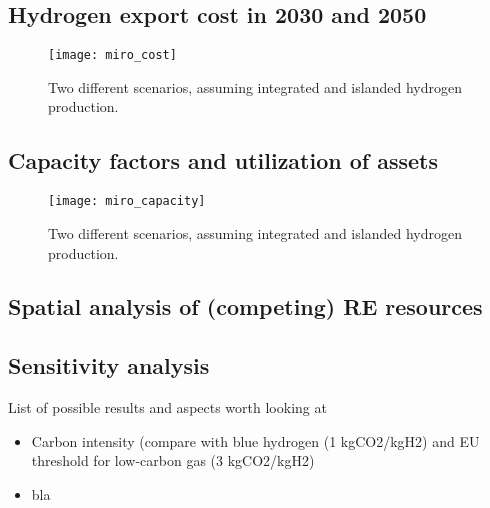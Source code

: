 \subsection{Hydrogen export cost in 2030 and 2050}

\begin{figure}[h!]
    \centering
    \texttt{[image: miro\_cost]}
    \caption{Two different scenarios, assuming integrated and islanded hydrogen production.}
    \label{fig:results_costs}
\end{figure}


\subsection{Capacity factors and utilization of assets}

\begin{figure}[h!]
    \centering
    \texttt{[image: miro\_capacity]}
    \caption{Two different scenarios, assuming integrated and islanded hydrogen production.}
    \label{fig:results_capacity}
\end{figure}

\subsection{Spatial analysis of (competing) RE resources}
\subsection{Sensitivity analysis}

List of possible results and aspects worth looking at
\begin{itemize}
    \item Carbon intensity (compare with blue hydrogen (1 kgCO2/kgH2) and EU threshold for low-carbon gas (3 kgCO2/kgH2)
    \item bla
\end{itemize}